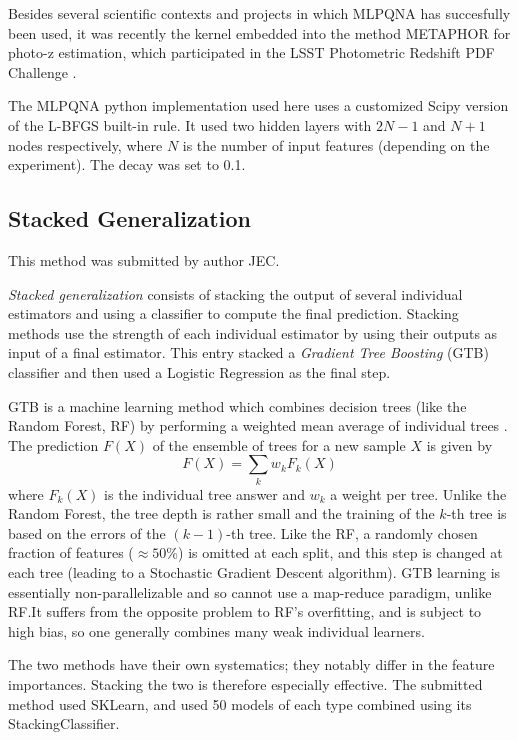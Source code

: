 \documentclass[twocolumn,twocolappendix]{aastex63}
\begin{document}
Besides several scientific contexts and projects in which MLPQNA has succesfully
been used, it was recently the kernel embedded into the method {\sc
METAPHOR} \citep{cavuoti20} for photo-z estimation, which participated in the
LSST Photometric Redshift PDF Challenge \citep{schmidt20}. 

The {\sc MLPQNA} python implementation used here
uses a customized Scipy version of the L-BFGS built-in rule.
It used two hidden layers with $2N-1$ and $N+1$ nodes respectively,
where $N$ is the number of input features (depending on the experiment).
The decay was set to 0.1.


\subsection{ {\sc Stacked Generalization} }
This method was submitted by author JEC.

\emph{Stacked generalization} consists of stacking the output of several individual estimators and 
using a classifier to compute the final prediction. Stacking methods use the strength of each 
individual estimator by using their outputs as input of a final estimator.  This entry stacked
a \emph{Gradient Tree Boosting} (GTB) classifier and then used a Logistic Regression as the final step.

GTB is a machine learning method which combines decision trees (like the Random Forest, RF)
by performing a weighted mean average of individual trees \citep{Friedman:2002we,RefWorks:1634}. 
The prediction $F(X)$ of the ensemble of trees for a new sample $X$ is given by
\begin{equation}
F(X) = \sum_k w_k F_k(X)
\end{equation}
where $F_k(X)$ is the individual tree answer and $w_k$ a weight per tree. Unlike the Random Forest, the 
tree depth is rather small and the training  of the $k$-th tree is based on the errors of the
$(k-1)$-th tree.  Like the RF, a randomly chosen fraction of features ($\approx 50\%$) is 
omitted at each split, and this step is changed at each tree (leading to a Stochastic Gradient Descent 
algorithm).  GTB learning is essentially non-parallelizable and so cannot use a map-reduce paradigm, 
unlike RF.It suffers from the opposite problem to RF's overfitting, and is subject
to high bias, so one generally combines many weak individual learners.

The two methods have their own systematics; they notably differ in the feature importances. Stacking 
the two is therefore especially effective.  The submitted method used {\sc SKLearn}, and used 50 models 
of each type combined using its {\sc StackingClassifier}.
\end{document}
